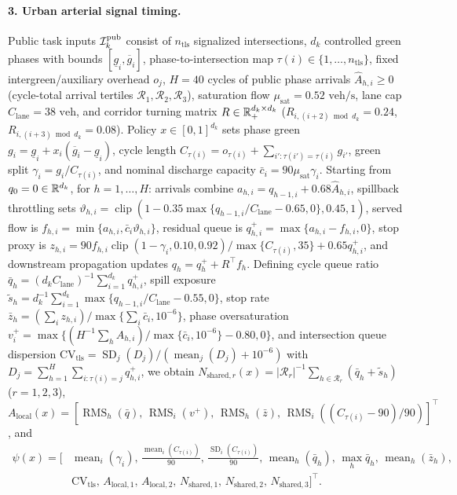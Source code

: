 \paragraph{3. Urban arterial signal timing.}
Public task inputs $\mathcal{I}_k^{\mathrm{pub}}$ consist of $n_{\mathrm{tls}}$ signalized intersections, $d_k$ controlled green phases with bounds $[\underline{g}_i, \overline{g}_i]$, phase-to-intersection map $\tau(i) \in \{1,\dots,n_{\mathrm{tls}}\}$, fixed intergreen/auxiliary overhead $o_j$, $H=40$ cycles of public phase arrivals $\hat{A}_{h,i} \ge 0$ (cycle-total arrival tertiles $\mathcal{R}_1, \mathcal{R}_2, \mathcal{R}_3$), saturation flow $\mu_{\mathrm{sat}}=0.52\text{ veh/s}$, lane cap $C_{\mathrm{lane}}=38\text{ veh}$, and corridor turning matrix $R \in \mathbb{R}_+^{d_k \times d_k}$ ($R_{i,(i+2)\bmod d_k}=0.24$, $R_{i,(i+3)\bmod d_k}=0.08$). Policy $x \in [0,1]^{d_k}$ sets phase green $g_i = \underline{g}_i + x_i(\overline{g}_i - \underline{g}_i)$, cycle length $C_{\tau(i)} = o_{\tau(i)} + \sum_{i':\tau(i')=\tau(i)} g_{i'}$, green split $\gamma_i = g_i / C_{\tau(i)}$, and nominal discharge capacity $\bar{c}_i = 90\mu_{\mathrm{sat}}\gamma_i$. Starting from $q_0 = 0 \in \mathbb{R}^{d_k}$, for $h = 1,\dots,H$: arrivals combine $a_{h,i} = q_{h-1,i} + 0.68\hat{A}_{h,i}$, spillback throttling sets $\vartheta_{h,i} = \operatorname{clip}(1 - 0.35\max\{q_{h-1,i}/C_{\mathrm{lane}} - 0.65, 0\}, 0.45, 1)$, served flow is $f_{h,i} = \min\{a_{h,i}, \bar{c}_i\vartheta_{h,i}\}$, residual queue is $q_{h,i}^+ = \max\{a_{h,i} - f_{h,i}, 0\}$, stop proxy is $z_{h,i} = 90 f_{h,i}\operatorname{clip}(1-\gamma_i, 0.10, 0.92)/\max\{C_{\tau(i)}, 35\} + 0.65 q_{h,i}^+$, and downstream propagation updates $q_h = q_h^+ + R^\top f_h$. Defining cycle queue ratio $\bar{q}_h = (d_k C_{\mathrm{lane}})^{-1}\sum_{i=1}^{d_k} q_{h,i}^+$, spill exposure $\tilde{s}_h = d_k^{-1}\sum_{i=1}^{d_k}\max\{q_{h-1,i}/C_{\mathrm{lane}} - 0.55, 0\}$, stop rate $\bar{z}_h = (\sum_i z_{h,i})/\max\{\sum_i \bar{c}_i, 10^{-6}\}$, phase oversaturation $v_i^+ = \max\{(H^{-1}\sum_h \hat{A}_{h,i})/\max\{\bar{c}_i, 10^{-6}\} - 0.80, 0\}$, and intersection queue dispersion $\mathrm{CV}_{\mathrm{tls}} = \operatorname{SD}_j(D_j)/(\operatorname{mean}_j(D_j)+10^{-6})$ with $D_j = \sum_{h=1}^H \sum_{i:\tau(i)=j} q_{h,i}^+$, we obtain $N_{\mathrm{shared},r}(x) = |\mathcal{R}_r|^{-1}\sum_{h \in \mathcal{R}_r}(\bar{q}_h + \tilde{s}_h)$ ($r=1,2,3$), $A_{\mathrm{local}}(x) = [\operatorname{RMS}_h(\bar{q}),\, \operatorname{RMS}_i(v^+),\, \operatorname{RMS}_h(\bar{z}),\, \operatorname{RMS}_i((C_{\tau(i)}-90)/90)]^\top$, and
\begin{align*}
  \psi(x) = \Big[&\operatorname{mean}_i(\gamma_i),\, \tfrac{\operatorname{mean}_i(C_{\tau(i)})}{90},\, \tfrac{\operatorname{SD}_i(C_{\tau(i)})}{90},\, \operatorname{mean}_h(\bar{q}_h),\, \max_h \bar{q}_h,\, \operatorname{mean}_h(\bar{z}_h), \\
  &\mathrm{CV}_{\mathrm{tls}},\, A_{\mathrm{local},1},\, A_{\mathrm{local},2},\, N_{\mathrm{shared},1},\, N_{\mathrm{shared},2},\, N_{\mathrm{shared},3}\Big]^\top.
\end{align*}


